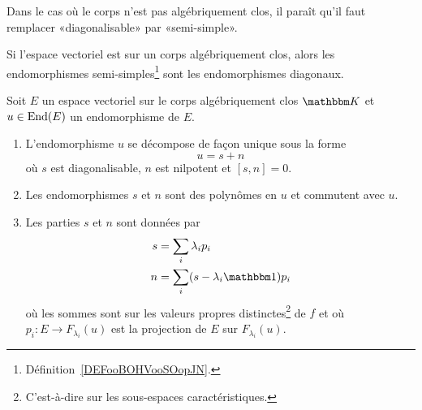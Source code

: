 \begin{probleme}
    Dans le cas où le corps n'est pas algébriquement clos, il paraît qu'il faut remplacer «diagonalisable» par «semi-simple».
\end{probleme}

Si l'espace vectoriel est sur un corps algébriquement clos, alors les endomorphismes semi-simples\footnote{Définition~\ref{DEFooBOHVooSOopJN}.} sont les endomorphismes diagonaux.


\begin{theorem} \label{ThoRURcpW}
    Soit \( E\) un espace vectoriel sur le corps algébriquement clos \( \eK\) et \( u\in\operatorname{End}(E)\) un endomorphisme de \( E\).

    \begin{enumerate}
        \item

            L'endomorphisme \( u\) se décompose de façon unique sous la forme
            \begin{equation}
                u=s+n
            \end{equation}
            où \( s\) est diagonalisable, \( n\) est nilpotent et \( [s,n]=0\).
        \item
            Les endomorphismes \( s\) et \( n\) sont des polynômes en \( u\) et commutent avec \( u\).
        \item   \label{ItemThoRURcpWiii}
            Les parties \( s\) et \( n\) sont données par
            \begin{subequations}
                \begin{align}
                    s&=\sum_i\lambda_ip_i\\
                    n&=\sum_i(s-\lambda_i\mtu)p_i
                \end{align}
            \end{subequations}
            où les sommes sont sur les valeurs propres distinctes\footnote{C'est-à-dire sur les sous-espaces caractéristiques.} de \( f\) et où \( p_i\colon E\to F_{\lambda_i}(u)\) est la projection de \( E\) sur \( F_{\lambda_i}(u)\).
    \end{enumerate}
\end{theorem}

